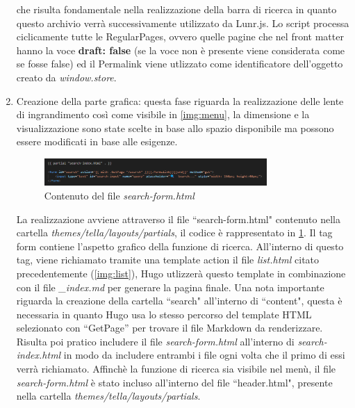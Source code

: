 \documentclass[target=bach,aauheader=]{thud}
\begin{document}
\begin{enumerate}
    che risulta fondamentale nella realizzazione della barra di ricerca in quanto questo archivio verrà successivamente utilizzato da Lunr.js.
    \newline 
    Lo script processa ciclicamente tutte le RegularPages, ovvero quelle pagine che nel front matter hanno la voce \textbf{draft: false} (se la voce non è presente viene considerata come se fosse false) ed il Permalink viene utlizzato come identificatore dell'oggetto creato da \textit{window.store}.
    \item Creazione della parte grafica: questa fase riguarda la realizzazione delle lente di ingrandimento così come visibile in \cref{img:menu}, la dimensione e la visualizzazione sono state scelte in base allo spazio disponibile ma possono essere modificati in base alle esigenze.
    \newline
    \begin{figure}
        \centering
        \includegraphics[width = 0.8\textwidth]{images/search-form.png}
        \caption{Contenuto del file \textit{search-form.html}}
        \label{img:form}
    \end{figure}
    \newline
    La realizzazione avviene attraverso il file ``search-form.html" contenuto nella cartella 
    \newline \textit{themes/tella/layouts/partials}, il codice è rappresentato in \cref{img:form}.
    Il tag form contiene l'aspetto grafico della funzione di ricerca. All'interno di questo tag, viene richiamato tramite una template action il file \textit{list.html} citato precedentemente (\cref{img:list}), Hugo utlizzerà questo template in combinazione con il file \textit{\_index.md} per generare la pagina finale. 
    \newline \newline 
    Una nota importante riguarda la creazione della cartella ``search" all'interno di ``content", questa è necessaria in quanto Hugo usa lo stesso percorso del template HTML selezionato con “GetPage” per trovare il file Markdown da renderizzare. 
    Risulta poi pratico includere il file \textit{search-form.html} all'interno di \textit{search-index.html} in modo da includere entrambi i file ogni volta che il primo di essi verrà richiamato. 
    \newline
    Affinchè la funzione di ricerca sia visibile nel menù, il file \textit{search-form.html} è stato incluso all'interno del file ``header.html", presente nella cartella \textit{themes/tella/layouts/partials}.

\end{enumerate}
\end{document}
